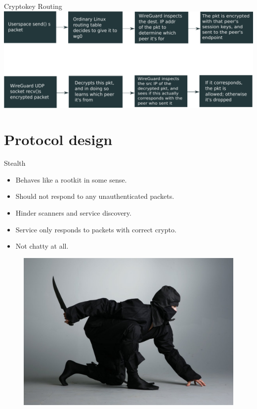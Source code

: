 \documentclass[xcolor=table]{beamer}
\begin{document}
    \begin{frame}[fragile]{Cryptokey Routing}
        \includegraphics[width=\textwidth]{crypto_route.pdf}
    \end{frame}

    \section{Protocol design}

     \begin{frame}{Stealth}
        \begin{minipage}{0.6\textwidth}
            \begin{itemize}
                \item Behaves like a rootkit in some sense.
                \item Should not respond to any unauthenticated packets.
                \item Hinder scanners and service discovery.
                \item Service only responds to packets with correct crypto.
                \item Not chatty at all.
            \end{itemize}
        \end{minipage}
        \begin{minipage}{0.37\textwidth}
            \begin{figure}
                \includegraphics[width=\textwidth]{ninja.jpg}
            \end{figure}
        \end{minipage}
    \end{frame}
\end{document}
